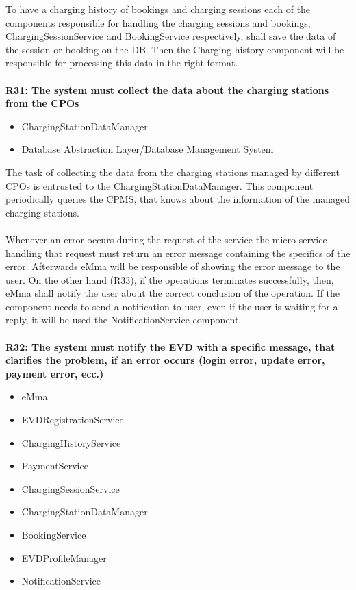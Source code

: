 To have a charging history of bookings and charging sessions each of the components responsible for handling the charging sessions and bookings, ChargingSessionService and BookingService respectively, shall save the data of the session or booking on the DB. Then the Charging history component will be responsible for processing this data in the right format.\\
\\
\textbf{R31: The system must collect the data about the charging stations from the CPOs}
\begin{itemize}
	\item ChargingStationDataManager
	\item Database Abstraction Layer/Database Management System
\end{itemize}
The task of collecting the data from the charging stations managed by different CPOs is entrusted to the ChargingStationDataManager. This component periodically queries the CPMS, that knows about the information of the managed charging stations.\\
\\
Whenever an error occurs during the request of the service the micro-service handling that request must return an error message containing the specifics of the error. Afterwards eMma will be responsible of showing the error message to the user. On the other hand (R33), if the operations terminates successfully, then, eMma shall notify the user about the correct conclusion of the operation. If the component needs to send a notification to user, even if the user is waiting for a reply, it will be used the NotificationService component.\\
\\
\textbf{R32: The system must notify the EVD with a specific message, that clarifies the problem, if an error occurs (login error, update error, payment error, ecc.)}
\begin{itemize}
	\item eMma
	\item EVDRegistrationService
	\item ChargingHistoryService
	\item PaymentService
	\item ChargingSessionService
	\item ChargingStationDataManager
	\item BookingService
	\item EVDProfileManager
	\item NotificationService
\end{itemize}

